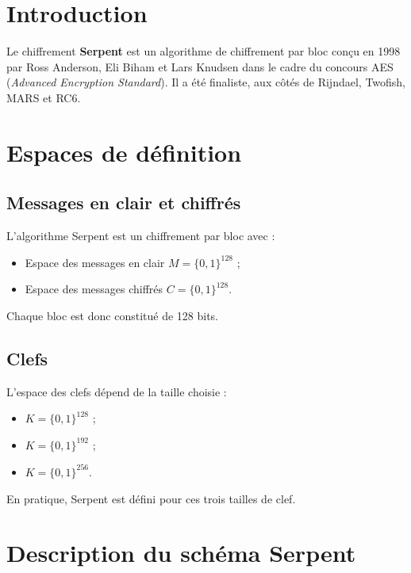 \documentclass[12pt,a4paper]{report}
\begin{document}
\tableofcontents










\section*{Introduction}

Le chiffrement \textbf{Serpent} est un algorithme de chiffrement par bloc
conçu en 1998 par Ross Anderson, Eli Biham et Lars Knudsen dans le cadre du concours AES
(\textit{Advanced Encryption Standard}). Il a été finaliste, aux côtés de Rijndael, Twofish, MARS et RC6.

\section*{Espaces de définition}

\subsection{Messages en clair et chiffrés}
L’algorithme Serpent est un chiffrement par bloc avec :
\begin{itemize}
    \item Espace des messages en clair $M = \{0,1\}^{128}$ ;
    \item Espace des messages chiffrés $C = \{0,1\}^{128}$.
\end{itemize}
Chaque bloc est donc constitué de 128 bits.

\subsection{Clefs}
L’espace des clefs dépend de la taille choisie :
\begin{itemize}
    \item $K = \{0,1\}^{128}$ ;
    \item $K = \{0,1\}^{192}$ ;
    \item $K = \{0,1\}^{256}$.
\end{itemize}
En pratique, Serpent est défini pour ces trois tailles de clef.










\section*{Description du schéma Serpent}
\end{document}
